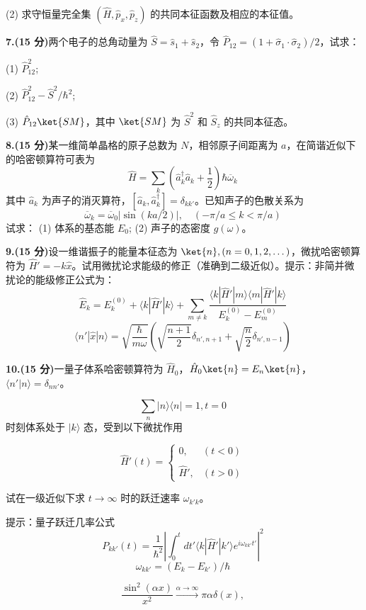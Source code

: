 (2) 求守恒量完全集 $(\hat{H}, \hat{p}_x, \hat{p}_z)$ 的共同本征函数及相应的本征值。

\textbf{7.(15 分)}两个电子的总角动量为 $\hat{S} = \hat{s}_1 + \hat{s}_2$，令 $\hat{P}_{12} = (1 + \hat{\sigma}_1 \cdot \hat{\sigma}_2)/2$，试求：

(1) $\hat{P}_{12}^2$;

(2) $\hat{P}_{12}^2 - \hat{S}^2/\hbar^2$;

(3) $\hat{P}_{12} \ket{SM}$，其中 $\ket{SM}$ 为 $\hat{S}^2$ 和 $\hat{S}_z$ 的共同本征态。

\textbf{8.(15 分)}某一维简单晶格的原子总数为 $N$，相邻原子间距离为 $a$，在简谐近似下的哈密顿算符可表为
$$\hat{H} = \sum_k \left(\hat a_k^\dagger \hat a_k + \frac{1}{2}\right)\hbar \overline{\omega}_k~$$
其中 $\hat a_k$ 为声子的消灭算符，$[\hat a_k, \hat a_k^\dagger] = \delta_{kk'}$。已知声子的色散关系为
$$\overline{\omega}_k = \overline{\omega}_0 |\sin(ka/2)|, \quad (-\pi/a \leq k < \pi/a)~$$
试求：
(1) 体系的基态能 $E_0$;
(2) 声子的态密度 $g(\omega)$。

\textbf{9.(15 分)}设一维谐振子的能量本征态为 $\ket{n}, (n = 0, 1, 2, \dots)$，微扰哈密顿算符为 $\hat{H}' = -k\hat{x}$。试用微扰论求能级的修正（准确到二级近似）。提示：非简并微扰论的能级修正公式为：
$$\hat{E}_k = E_k^{(0)} + \langle k|\hat{H}'|k\rangle + \sum_{m\neq k} \frac{\langle k|\hat{H}'|m\rangle \langle m|\hat{H}'|k\rangle}{E_k^{(0)} - E_m^{(0)}}~$$
$$\langle n'|\hat{x}|n \rangle = \sqrt{\frac{\hbar}{m\omega}} \left( \sqrt{\frac{n+1}{2}} \delta_{n',n+1} + \sqrt{\frac{n}{2}} \delta_{n',n-1} \right)~$$ 

\textbf{10.(15 分)}一量子体系哈密顿算符为 $\hat{H}_0$，$\hat{H}_0\ket{n} = E_n \ket{n}$，$\langle n'|n\rangle = \delta_{nn'}$。

$$\sum_n |n\rangle \langle n| = 1, t = 0~$$
时刻体系处于 $|k\rangle$ 态，受到以下微扰作用

$$\hat{H}'(t) = \begin{cases} 0, & (t < 0) \\\\\hat{H}', & (t > 0) \end{cases}~$$

试在一级近似下求 $t \rightarrow \infty$ 时的跃迁速率 $\omega_{k'k}$。

提示：量子跃迁几率公式
$$P_{kk'}(t) = \frac{1}{\hbar^2} \left| \int_0^t dt' \langle k|\hat{H}'|k'\rangle e^{i\omega_{kk'}t'} \right|^2~$$
$$\omega_{kk'} = (E_k - E_{k'})/\hbar~$$

$$\frac{\sin^2(\alpha x)}{x^2} \xrightarrow{\alpha \rightarrow \infty} \pi \alpha \delta(x),~$$
